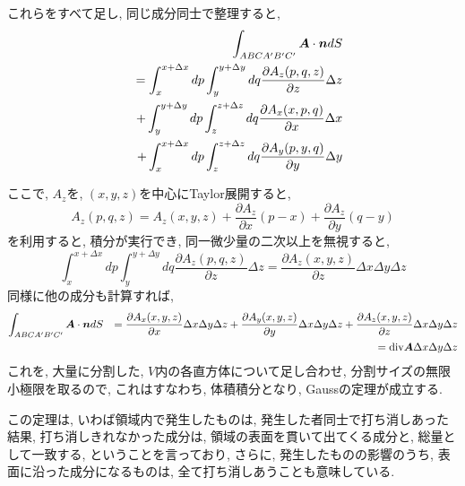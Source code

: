 \documentclass{jsarticle}
\newcommand*{\mbold}[1]{\mbox{\boldmath $#1$}}
\newcommand*{\divg}{{\rm div}}
\begin{document}
これらをすべて足し, 同じ成分同士で整理すると, 
\begin{eqnarray}
  && \int_{ABCA^\prime B^\prime C^\prime} \mbold{A}\cdot \mbold{n}dS \nonumber \\
  && = \int_x^{x + \Delta x}dp \int_y^{y + \Delta y}dq \frac{\partial A_z(p, q, z)}{\partial z}\Delta z \nonumber \\
  && + \int_y^{y + \Delta y}dp \int_z^{z + \Delta z}dq \frac{\partial A_x(x, p, q)}{\partial x}\Delta x \nonumber \\
  && + \int_x^{x + \Delta x}dp \int_z^{z + \Delta z}dq \frac{\partial A_y(p, y, q)}{\partial y}\Delta y 
\end{eqnarray}

ここで, $A_z$を, $(x, y, z)$を中心にTaylor展開すると, 
\begin{equation}
  A_z(p, q, z) = A_z(x, y, z) + \frac{\partial A_z}{\partial x}(p - x) + \frac{\partial A_z}{\partial y}(q - y)
\end{equation}
を利用すると, 積分が実行でき, 同一微少量の二次以上を無視すると, 
\begin{equation}
  \int_x^{x + \Delta x}dp \int_y^{y + \Delta y}dq \frac{\partial A_z(p, q, z)}{\partial z}\Delta z
  = \frac{\partial A_z(x, y, z)}{\partial z}\Delta x \Delta y \Delta z
\end{equation}
同様に他の成分も計算すれば, 
\begin{eqnarray}
  \int_{ABCA^\prime B^\prime C^\prime} \mbold{A}\cdot \mbold{n}dS
  && = \frac{\partial A_x(x, y, z)}{\partial x}\Delta x \Delta y \Delta z
  + \frac{\partial A_y(x, y, z)}{\partial y}\Delta x \Delta y \Delta z
  + \frac{\partial A_z(x, y, z)}{\partial z}\Delta x \Delta y \Delta z \nonumber\\
  && = \divg\mbold{A} \Delta x \Delta y \Delta z
\end{eqnarray}
これを, 大量に分割した, $V$内の各直方体について足し合わせ, 分割サイズの無限小極限を取るので, 
これはすなわち, 体積積分となり, Gaussの定理が成立する. 

この定理は, いわば領域内で発生したものは, 発生した者同士で打ち消しあった結果, 打ち消しきれなかった成分は, 
領域の表面を貫いて出てくる成分と, 総量として一致する, ということを言っており, さらに, 
発生したものの影響のうち, 表面に沿った成分になるものは, 全て打ち消しあうことも意味している. 
\end{document}
